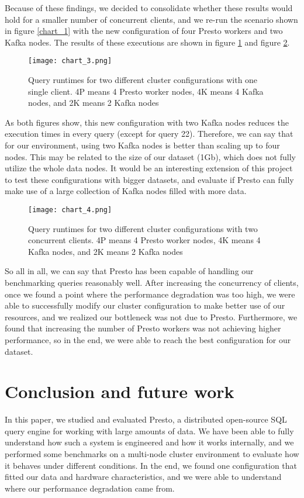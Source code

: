 \documentclass[conference]{IEEEtran}
\begin{document}
Because of these findings, we decided to consolidate whether these results would hold for a smaller number of concurrent clients, and we re-run the scenario shown in figure \ref{chart_1} with the new configuration of four Presto workers and two Kafka nodes. The results of these executions are shown in figure \ref{chart_3} and figure \ref{chart_4}.

\begin{figure}[htbp]
\centerline{\texttt{[image: chart\_3.png]}}
\caption{Query runtimes for two different cluster configurations with one single client. 4P means 4 Presto worker nodes, 4K means 4 Kafka nodes, and 2K means 2 Kafka nodes}
\label{chart_3}
\end{figure}

As both figures show, this new configuration with two Kafka nodes reduces the execution times in every query (except for query 22). Therefore, we can say that for our environment, using two Kafka nodes is better than scaling up to four nodes. This may be related to the size of our dataset (1Gb), which does not fully utilize the whole data nodes. It would be an interesting extension of this project to test these configurations with bigger datasets, and evaluate if Presto can fully make use of a large collection of Kafka nodes filled with more data.

\begin{figure}[htbp]
\centerline{\texttt{[image: chart\_4.png]}}
\caption{Query runtimes for two different cluster configurations with two concurrent clients. 4P means 4 Presto worker nodes, 4K means 4 Kafka nodes, and 2K means 2 Kafka nodes}
\label{chart_4}
\end{figure}

So all in all, we can say that Presto has been capable of handling our benchmarking queries reasonably well. After increasing the concurrency of clients, once we found a point where the performance degradation was too high, we were able to successfully modify our cluster configuration to make better use of our resources, and we realized our bottleneck was not due to Presto. Furthermore, we found that increasing the number of Presto workers was not achieving higher performance, so in the end, we were able to reach the best configuration for our dataset.

\section{Conclusion and future work} \label{conclusions}
In this paper, we studied and evaluated Presto, a distributed open-source SQL query engine for working with large amounts of data. We have been able to fully understand how such a system is engineered and how it works internally, and we performed some benchmarks on a multi-node cluster environment to evaluate how it behaves under different conditions. In the end, we found one configuration that fitted our data and hardware characteristics, and we were able to understand where our performance degradation came from.
\end{document}
